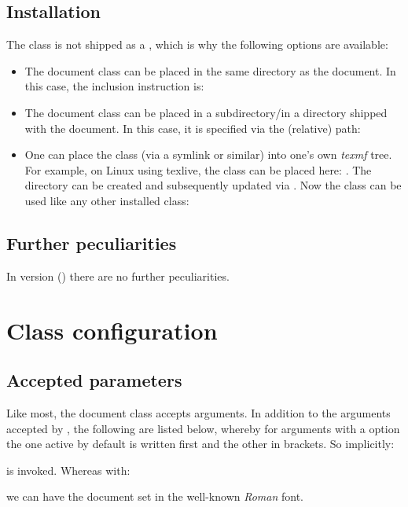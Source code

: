 \documentclass{sopra-base}
\begin{document}
\subsection{Installation}
    The class is not shipped as a , which is why the
    following options are available:
    \begin{itemize}
        \item The document class can be placed in the same directory as the
                document. In this case, the inclusion instruction is:
        \item The document class can be placed in a subdirectory/in a
                directory shipped with the document. In this case, it is
                specified via the (relative) path:
        \item One can place the class (via a symlink or similar) into
              one's own \emph{texmf} tree.
              For example, on Linux using texlive, the class can be
              placed here: .
              The directory can be created and subsequently updated via
              . Now the class can be used like
              any other installed class:
    \end{itemize}
    \subsection{Further peculiarities}
    In version \thesobversion{} () there are no further
    peculiarities.

\section{Class configuration}
    \subsection{Accepted parameters}
    Like most, the document class accepts arguments. In addition to the
    arguments accepted by , the following are listed below,
    whereby for arguments with a  option the one active by
    default is written first and the other in brackets. So implicitly:
    is invoked. Whereas with:
    we can have the document set in the well-known \emph{Roman} font.
\end{document}
